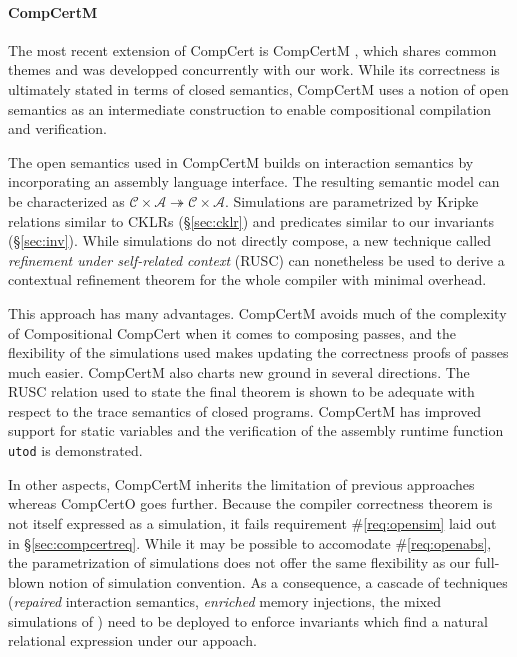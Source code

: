 \documentclass[acmsmall,screen,review,anonymous]{acmart}
\begin{document}

\paragraph{CompCertM} %

The most recent extension of CompCert is CompCertM \cite{compcertm},
which shares common themes and was developped concurrently
with our work.
While its correctness
is ultimately stated in terms of closed semantics,
CompCertM uses a notion of open semantics
as an intermediate construction
to enable compositional compilation and verification.

The open semantics used in CompCertM
builds on interaction semantics
by incorporating an assembly language interface.
The resulting semantic model can be characterized as
$\mathcal{C} \times \mathcal{A} \twoheadrightarrow
 \mathcal{C} \times \mathcal{A}$.
Simulations
are parametrized by Kripke relations similar to CKLRs (\S\ref{sec:cklr})
and predicates similar to our invariants (\S\ref{sec:inv}).
While simulations do not directly compose,
a new technique called \emph{refinement under self-related context}
(RUSC)
can nonetheless be used to derive a contextual refinement theorem
for the whole compiler with minimal overhead.

This approach has many advantages.
CompCertM avoids much of the complexity
of Compositional CompCert
when it comes to composing passes,
and the flexibility of the simulations used
makes updating the correctness proofs of passes much easier.
CompCertM also charts new ground in several directions.
The RUSC relation used to state the final theorem
is shown to be adequate with respect to the trace semantics
of closed programs.
CompCertM has improved support for static variables
and the verification of
the assembly runtime function \texttt{utod} is demonstrated.

In other aspects,
CompCertM inherits the limitation of previous approaches
whereas CompCertO goes further.
Because the compiler correctness theorem
is not itself expressed as a simulation,
it fails requirement \#\ref{req:opensim}
laid out in \S\ref{sec:compcertreq}.
While it may be possible to accomodate \#\ref{req:openabs},
the parametrization of simulations
does not offer the same flexibility as
our full-blown notion of simulation convention.
As a consequence, a cascade of techniques
(\emph{repaired} interaction semantics,
\emph{enriched} memory injections,
the mixed simulations of \cite{pilsner})
need to be deployed to enforce invariants
which find a natural relational expression
under our appoach.
\end{document}
